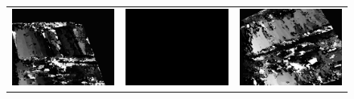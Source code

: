 \documentclass[11pt]{report}
\begin{document}
\begin{figure}[H]
\begin{tabular}{ccc}
    \includegraphics[scale=0.1]{images/disparity-opencv-t/disparity_6.png} &
    \includegraphics[scale=0.1]{images/disparity-opencv-d/disparity_6.png} &
    \includegraphics[scale=0.1]{images/disparity-opengv/disparity_6.png} \\

\end{tabular}
\end{figure}
\end{document}
